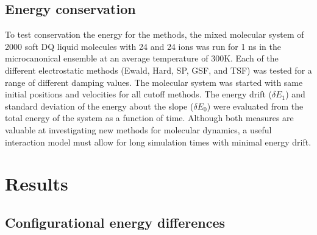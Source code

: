 \subsection{Energy conservation}
To test conservation the energy for the methods, the mixed molecular
system of 2000 soft DQ liquid molecules with 24  and 24
 ions was run for 1 ns in the microcanonical ensemble at an
average temperature of 300K.  Each of the different electrostatic
methods (Ewald, Hard, SP, GSF, and TSF) was tested for a range of
different damping values. The molecular system was started with same
initial positions and velocities for all cutoff methods. The energy
drift ($\delta E_1$) and standard deviation of the energy about the
slope ($\delta E_0$) were evaluated from the total energy of the
system as a function of time.  Although both measures are valuable at
investigating new methods for molecular dynamics, a useful interaction
model must allow for long simulation times with minimal energy drift.

\section{\label{sec:result}Results}
\subsection{Configurational energy differences}
 
